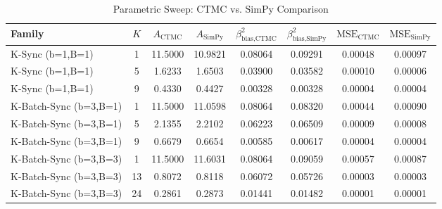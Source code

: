 \begin{table}[t]
\centering
\caption{Parametric Sweep: CTMC vs. SimPy Comparison}
\label{tab:parametric_sweep}
\begin{tabular}{lccccccc}
\toprule
\textbf{Family} & $K$ & $A_{\text{CTMC}}$ & $A_{\text{SimPy}}$ & $\beta^2_{\text{bias,CTMC}}$ & $\beta^2_{\text{bias,SimPy}}$ & $\text{MSE}_{\text{CTMC}}$ & $\text{MSE}_{\text{SimPy}}$ \\
\midrule
K-Sync (b=1,B=1) & 1 & 11.5000 & 10.9821 & 0.08064 & 0.09291 & 0.00048 & 0.00097 \\
K-Sync (b=1,B=1) & 5 & 1.6233 & 1.6503 & 0.03900 & 0.03582 & 0.00010 & 0.00006 \\
K-Sync (b=1,B=1) & 9 & 0.4330 & 0.4427 & 0.00328 & 0.00328 & 0.00004 & 0.00004 \\
K-Batch-Sync (b=3,B=1) & 1 & 11.5000 & 11.0598 & 0.08064 & 0.08320 & 0.00044 & 0.00090 \\
K-Batch-Sync (b=3,B=1) & 5 & 2.1355 & 2.2102 & 0.06223 & 0.06509 & 0.00009 & 0.00008 \\
K-Batch-Sync (b=3,B=1) & 9 & 0.6679 & 0.6654 & 0.00585 & 0.00617 & 0.00004 & 0.00004 \\
K-Batch-Sync (b=3,B=3) & 1 & 11.5000 & 11.6031 & 0.08064 & 0.09059 & 0.00057 & 0.00087 \\
K-Batch-Sync (b=3,B=3) & 13 & 0.8072 & 0.8118 & 0.06072 & 0.05726 & 0.00003 & 0.00003 \\
K-Batch-Sync (b=3,B=3) & 24 & 0.2861 & 0.2873 & 0.01441 & 0.01482 & 0.00001 & 0.00001 \\
\bottomrule
\end{tabular}
\end{table}
